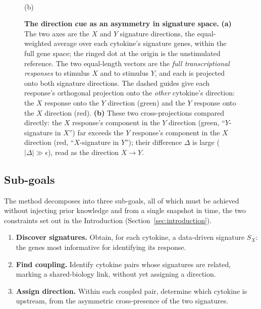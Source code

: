 \documentclass[11pt,a4paper]{article}
\begin{document}
\begin{figure}[H]
\begin{minipage}[c]{0.5\textwidth}
\\[2pt]
{\footnotesize (b)}
\end{minipage}
\caption{\textbf{The direction cue as an asymmetry in signature space.} \textbf{(a)} The
two axes are the $X$ and $Y$ signature directions, the equal-weighted average over each
cytokine's signature genes, within the full gene space; the ringed dot at the origin is the
unstimulated reference. The two equal-length vectors are the \emph{full transcriptional
responses} to stimulus $X$ and to stimulus $Y$, and each is projected onto both signature
directions. The dashed guides give each response's orthogonal projection onto the
\emph{other} cytokine's direction: the $X$ response onto the $Y$ direction (green) and the
$Y$ response onto the $X$ direction (red). \textbf{(b)} These two cross-projections compared
directly: the $X$ response's component in the $Y$ direction (green, ``$Y$-signature in
$X$'') far exceeds the $Y$ response's component in the $X$ direction (red, ``$X$-signature
in $Y$''); their difference
$\Delta$ is large ($\lvert\Delta\rvert \gg \epsilon$), read as the direction $X \to Y$.}
\label{fig:asymmetry}
\end{figure}

\subsection{Sub-goals}
\label{sec:methods-subgoals}
The method decomposes into three sub-goals, all of which must be achieved without injecting prior knowledge and from a single snapshot in time, the two constraints set out in the Introduction (Section~\ref{sec:introduction}).
\begin{enumerate}
\item \textbf{Discover signatures.} Obtain, for each cytokine, a data-driven signature $S_X$: the genes most informative for identifying its response.
\item \textbf{Find coupling.} Identify cytokine pairs whose signatures are related, marking a shared-biology link, without yet assigning a direction.
\item \textbf{Assign direction.} Within each coupled pair, determine which cytokine is upstream, from the asymmetric cross-presence of the two signatures.
\end{enumerate}
\end{document}
